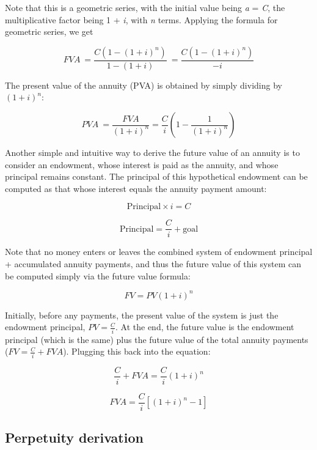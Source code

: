 Note that this is a geometric series, with the initial value being \textit{a} =
\textit{C}, the multiplicative factor being 1 + \textit{i}, with \textit{n} terms.
Applying the formula for geometric series, we get



$$FVA \ = \frac{ C ( 1 - (1+i)^n )}{1 - (1+i)} \ = \frac{ C ( 1 - (1+i)^n )}{-i}$$



The present value of the annuity (PVA) is obtained by simply dividing by $(1+i)^n$:



$$PVA \ = \frac{FVA}{(1+i)^n} = \frac{C}{i} \left( 1 - \frac{1}{(1+i)^n} \right)$$



Another simple and intuitive way to derive the future value of an annuity is to consider
an endowment, whose interest is paid as the annuity, and whose principal remains constant.
The principal of this hypothetical endowment can be computed as that whose interest equals
the annuity payment amount:



$$\text{Principal} \times i = C$$



$$\text{Principal} = \frac{C}{i} + \text{goal}$$



Note that no money enters or leaves the combined system of endowment principal +
accumulated annuity payments, and thus the future value of this system can be computed
simply via the future value formula:



$$FV = PV(1+i)^n$$



Initially, before any payments, the present value of the system is just the endowment
principal, $PV = \frac{C}{i}$. At the end, the future value is the endowment principal
(which is the same) plus the future value of the total annuity payments ($FV = \frac{C}{i}
+ FVA$). Plugging this back into the equation:



$$\frac{C}{i} + FVA = \frac{C}{i} (1+i)^n$$



$$FVA = \frac{C}{i} \left[ \left(1+i \right)^n - 1 \right]$$




\subsection{Perpetuity derivation}
\label{sss:perp-8965}




